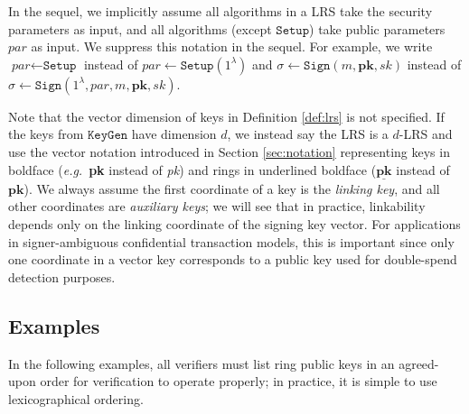 \documentclass[draft]{llncs} %
\begin{document}
In the sequel, we implicitly assume all algorithms in a LRS take the security parameters as input, and all algorithms (except $\texttt{Setup}$) take public parameters $\textit{par}$ as input. We suppress this notation in the sequel. For example, we write $\textit{par} \leftarrow \texttt{Setup}$ instead of $\textit{par} \leftarrow \texttt{Setup}(1^\lambda)$ and $\sigma \leftarrow \texttt{Sign}(m, \textbf{pk}, \textit{sk})$ instead of $\sigma \leftarrow \texttt{Sign}(1^\lambda, \textit{par}, m, \textbf{pk}, \textit{sk})$.

Note that the vector dimension of keys in Definition \ref{def:lrs} is not specified. If the keys from $\texttt{KeyGen}$ have dimension $d$, we instead say the LRS is a $d$-LRS and use the vector notation introduced in Section \ref{sec:notation} representing keys in boldface (\textit{e.g.}\ \textbf{pk} instead of \textit{pk}) and rings in underlined boldface ($\underline{\textbf{pk}}$ instead of $\textbf{pk}$). We always assume the first coordinate of a key is the \textit{linking key}, and all other coordinates are \textit{auxiliary keys}; we will see that in practice, linkability depends only on the linking coordinate of the signing key vector. For applications in signer-ambiguous confidential transaction models, this is important since only one coordinate in a vector key corresponds to a public key used for double-spend detection purposes.


\subsection{Examples}\label{sec:examples}

In the following examples, all verifiers must list ring public keys in an agreed-upon order for verification to operate properly; in practice, it is simple to use lexicographical ordering.
\end{document}

